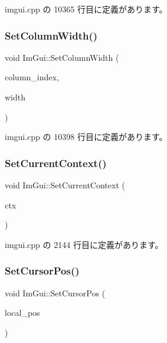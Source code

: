 imgui.\+cpp の 10365 行目に定義があります。

\mbox{\label{namespace_im_gui_af17222ec47aebb5ede00be7b52de9f5d}} 
\subsubsection{\texorpdfstring{Set\+Column\+Width()}{SetColumnWidth()}}
{\footnotesize\ttfamily void Im\+Gui\+::\+Set\+Column\+Width (\begin{DoxyParamCaption}\item[{int}]{column\+\_\+index,  }\item[{float}]{width }\end{DoxyParamCaption})}



 imgui.\+cpp の 10398 行目に定義があります。

\mbox{\label{namespace_im_gui_a289dbbbffdadcf1231821d97a7c4a9be}} 
\subsubsection{\texorpdfstring{Set\+Current\+Context()}{SetCurrentContext()}}
{\footnotesize\ttfamily void Im\+Gui\+::\+Set\+Current\+Context (\begin{DoxyParamCaption}\item[{\mbox{\hyperlink{struct_im_gui_context}{Im\+Gui\+Context}} $\ast$}]{ctx }\end{DoxyParamCaption})}



 imgui.\+cpp の 2144 行目に定義があります。

\mbox{\label{namespace_im_gui_a51ea13c986360d8a2e868dc9eeac2115}} 
\subsubsection{\texorpdfstring{Set\+Cursor\+Pos()}{SetCursorPos()}}
{\footnotesize\ttfamily void Im\+Gui\+::\+Set\+Cursor\+Pos (\begin{DoxyParamCaption}\item[{const \mbox{\hyperlink{struct_im_vec2}{Im\+Vec2}} \&}]{local\+\_\+pos }\end{DoxyParamCaption})}



